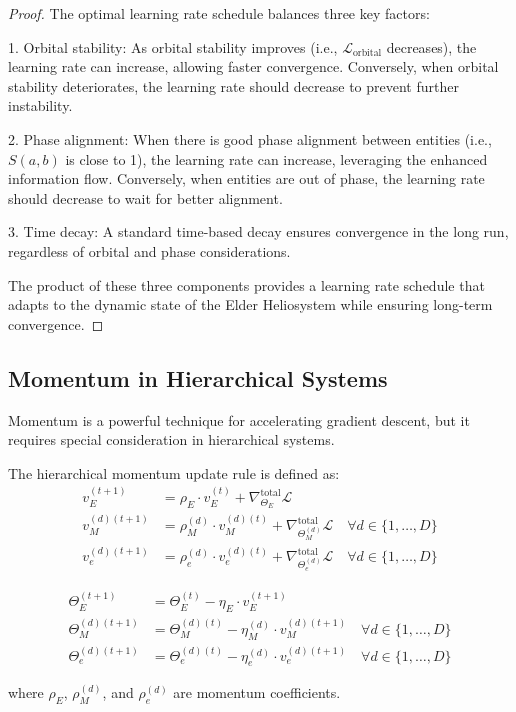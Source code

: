 \begin{proof}
The optimal learning rate schedule balances three key factors:

1. Orbital stability: As orbital stability improves (i.e., $\mathcal{L}_{\text{orbital}}$ decreases), the learning rate can increase, allowing faster convergence. Conversely, when orbital stability deteriorates, the learning rate should decrease to prevent further instability.

2. Phase alignment: When there is good phase alignment between entities (i.e., $S(a, b)$ is close to 1), the learning rate can increase, leveraging the enhanced information flow. Conversely, when entities are out of phase, the learning rate should decrease to wait for better alignment.

3. Time decay: A standard time-based decay ensures convergence in the long run, regardless of orbital and phase considerations.

The product of these three components provides a learning rate schedule that adapts to the dynamic state of the Elder Heliosystem while ensuring long-term convergence.
\end{proof}

\subsection{Momentum in Hierarchical Systems}

Momentum is a powerful technique for accelerating gradient descent, but it requires special consideration in hierarchical systems.

\begin{definition}
The hierarchical momentum update rule is defined as:
\begin{align}
v_E^{(t+1)} &= \rho_E \cdot v_E^{(t)} + \nabla_{\Theta_E}^{\text{total}} \mathcal{L} \\
v_M^{(d)(t+1)} &= \rho_M^{(d)} \cdot v_M^{(d)(t)} + \nabla_{\Theta_M^{(d)}}^{\text{total}} \mathcal{L} \quad \forall d \in \{1, \ldots, D\} \\
v_e^{(d)(t+1)} &= \rho_e^{(d)} \cdot v_e^{(d)(t)} + \nabla_{\Theta_e^{(d)}}^{\text{total}} \mathcal{L} \quad \forall d \in \{1, \ldots, D\}
\end{align}

\begin{align}
\Theta_E^{(t+1)} &= \Theta_E^{(t)} - \eta_E \cdot v_E^{(t+1)} \\
\Theta_M^{(d)(t+1)} &= \Theta_M^{(d)(t)} - \eta_M^{(d)} \cdot v_M^{(d)(t+1)} \quad \forall d \in \{1, \ldots, D\} \\
\Theta_e^{(d)(t+1)} &= \Theta_e^{(d)(t)} - \eta_e^{(d)} \cdot v_e^{(d)(t+1)} \quad \forall d \in \{1, \ldots, D\}
\end{align}

where $\rho_E$, $\rho_M^{(d)}$, and $\rho_e^{(d)}$ are momentum coefficients.
\end{definition}

